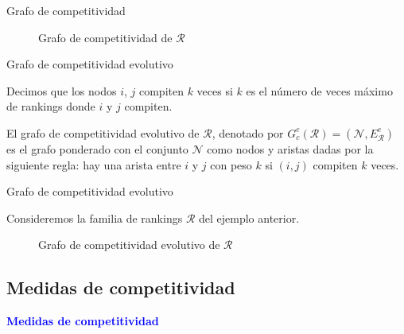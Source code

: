 \documentclass[10pt,hyperref={unicode}]{beamer}
\begin{document}
	\begin{frame}{Grafo de competitividad}
		\begin{ejemplo}[continuación]
			\begin{figure}
				\centering
				\ejemplografocompetitividad
				\caption{Grafo de competitividad de $\mathcal{R}$}
				\label{fig:grafo_competitividad}
			\end{figure}	
		\end{ejemplo}
	\end{frame}
	
	\begin{frame}{Grafo de competitividad evolutivo}
		\begin{defi}
			Decimos que los nodos $i$, $j$ compiten $k$ veces si $k$ es el número de veces máximo de rankings donde $i$ y $j$ compiten.
		\end{defi}
		
		\begin{defi}
			El grafo de competitividad evolutivo de $\mathcal{R}$, denotado por $G_c^e(\mathcal{R}) = (\mathcal{N}, E_\mathcal{R}^e)$ es el grafo ponderado con el conjunto $\mathcal{N}$ como nodos y aristas dadas por la siguiente regla: hay una arista entre $i$ y $j$ con peso $k$ si $(i,j)$ compiten $k$ veces.
		\end{defi}
	\end{frame}
	
	\begin{frame}{Grafo de competitividad evolutivo}
		\begin{ejemplo}
			Consideremos la familia de rankings $\mathcal{R}$ del ejemplo anterior.
			
			\begin{figure}
				\centering
				\resizebox{!}{0.5\textheight}{\ejemplografocompetitividadevolutivo}
				
				\caption{Grafo de competitividad evolutivo de $\mathcal{R}$}
				\label{fig:grafo_competitividad_evolutivo}
			\end{figure}
			
		\end{ejemplo}
	\end{frame}
	
	\subsection{Medidas de competitividad}
	
	\begin{frame}
		\begin{center}
			\Huge\textbf{\textsf{\textcolor{blue}{Medidas de competitividad}}}
		\end{center}
	\end{frame}
	
\end{document}
